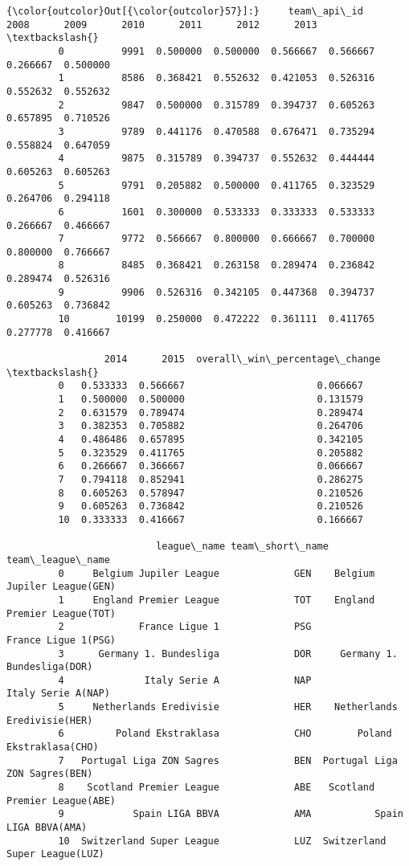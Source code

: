 \documentclass[11pt]{article}
\begin{document}
\begin{Verbatim}[commandchars=\\\{\}]
{\color{outcolor}Out[{\color{outcolor}57}]:}     team\_api\_id      2008      2009      2010      2011      2012      2013  \textbackslash{}
         0          9991  0.500000  0.500000  0.566667  0.566667  0.266667  0.500000   
         1          8586  0.368421  0.552632  0.421053  0.526316  0.552632  0.552632   
         2          9847  0.500000  0.315789  0.394737  0.605263  0.657895  0.710526   
         3          9789  0.441176  0.470588  0.676471  0.735294  0.558824  0.647059   
         4          9875  0.315789  0.394737  0.552632  0.444444  0.605263  0.605263   
         5          9791  0.205882  0.500000  0.411765  0.323529  0.264706  0.294118   
         6          1601  0.300000  0.533333  0.333333  0.533333  0.266667  0.466667   
         7          9772  0.566667  0.800000  0.666667  0.700000  0.800000  0.766667   
         8          8485  0.368421  0.263158  0.289474  0.236842  0.289474  0.526316   
         9          9906  0.526316  0.342105  0.447368  0.394737  0.605263  0.736842   
         10        10199  0.250000  0.472222  0.361111  0.411765  0.277778  0.416667   
         
                 2014      2015  overall\_win\_percentage\_change  \textbackslash{}
         0   0.533333  0.566667                       0.066667   
         1   0.500000  0.500000                       0.131579   
         2   0.631579  0.789474                       0.289474   
         3   0.382353  0.705882                       0.264706   
         4   0.486486  0.657895                       0.342105   
         5   0.323529  0.411765                       0.205882   
         6   0.266667  0.366667                       0.066667   
         7   0.794118  0.852941                       0.286275   
         8   0.605263  0.578947                       0.210526   
         9   0.605263  0.736842                       0.210526   
         10  0.333333  0.416667                       0.166667   
         
                          league\_name team\_short\_name               team\_league\_name  
         0     Belgium Jupiler League             GEN    Belgium Jupiler League(GEN)  
         1     England Premier League             TOT    England Premier League(TOT)  
         2             France Ligue 1             PSG            France Ligue 1(PSG)  
         3      Germany 1. Bundesliga             DOR     Germany 1. Bundesliga(DOR)  
         4              Italy Serie A             NAP             Italy Serie A(NAP)  
         5     Netherlands Eredivisie             HER    Netherlands Eredivisie(HER)  
         6         Poland Ekstraklasa             CHO        Poland Ekstraklasa(CHO)  
         7   Portugal Liga ZON Sagres             BEN  Portugal Liga ZON Sagres(BEN)  
         8    Scotland Premier League             ABE   Scotland Premier League(ABE)  
         9            Spain LIGA BBVA             AMA           Spain LIGA BBVA(AMA)  
         10  Switzerland Super League             LUZ  Switzerland Super League(LUZ)  
\end{Verbatim}
            
\end{document}
